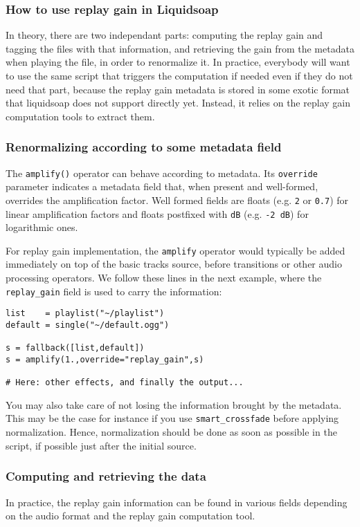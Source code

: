 \subsubsection{How to use replay gain in Liquidsoap}
In theory, there are two independant parts: computing the replay gain and tagging the files with that information, and retrieving the gain from the metadata when playing the file, in order to renormalize it. In practice, everybody will want to use the same script that triggers the computation if needed even if they do not need that part, because the replay gain metadata is stored in some exotic format that liquidsoap does not support directly yet. Instead, it relies on the replay gain computation tools to extract them.

\subsubsection{Renormalizing according to some metadata field}
The \verb+amplify()+ operator can behave according to metadata. Its \verb+override+ parameter indicates a metadata field that, when present and well-formed, overrides the amplification factor. Well formed fields are floats (e.g. \verb+2+ or \verb+0.7+) for linear amplification factors and floats postfixed with \verb+dB+ (e.g. \verb+-2 dB+) for logarithmic ones.

For replay gain implementation, the \verb+amplify+ operator would typically be added immediately on top of the basic tracks source, before transitions or other audio processing operators. We follow these lines in the next example, where the \verb+replay_gain+ field is used to carry the information:

\begin{verbatim}
list    = playlist("~/playlist")
default = single("~/default.ogg")

s = fallback([list,default])
s = amplify(1.,override="replay_gain",s)

# Here: other effects, and finally the output...
\end{verbatim}
You may also take care of not losing the information brought by the metadata. This may be the case for instance if you
use \verb+smart_crossfade+ before applying normalization. Hence, normalization should be done as soon as possible 
in the script, if possible just after the initial source.

\subsubsection{Computing and retrieving the data}
In practice, the replay gain information can be found in various fields depending on the audio format and the replay gain computation tool.

